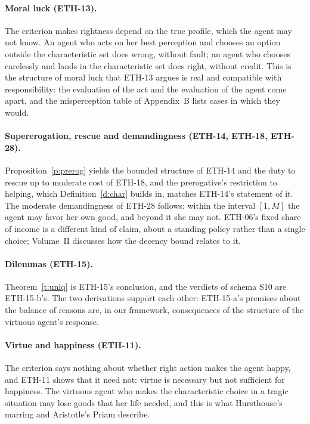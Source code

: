 \documentclass{situationist-preprint}
\begin{document}
\paragraph{Moral luck (ETH-13).} The criterion makes rightness depend on the true profile, which the agent may not know. An agent who acts on her best perception and chooses an option outside the characteristic set does wrong, without fault; an agent who chooses carelessly and lands in the characteristic set does right, without credit. This is the structure of moral luck that ETH-13 argues is real and compatible with responsibility: the evaluation of the act and the evaluation of the agent come apart, and the misperception table of Appendix~B lists \stnmisout{} cases in which they would.

\paragraph{Supererogation, rescue and demandingness (ETH-14, ETH-18, ETH-28).} Proposition~\ref{p:prerog} yields the bounded structure of ETH-14 and the duty to rescue up to moderate cost of ETH-18, and the prerogative's restriction to helping, which Definition~\ref{d:char} builds in, matches ETH-14's statement of it. The moderate demandingness of ETH-28 follows: within the interval $[1,M]$ the agent may favor her own good, and beyond it she may not. ETH-06's fixed share of income is a different kind of claim, about a standing policy rather than a single choice; Volume~II discusses how the decency bound relates to it.

\paragraph{Dilemmas (ETH-15).} Theorem~\ref{t:uniq} is ETH-15's conclusion, and the verdicts of schema S10 are ETH-15-b's. The two derivations support each other: ETH-15-a's premises about the balance of reasons are, in our framework, consequences of the structure of the virtuous agent's response.

\paragraph{Virtue and happiness (ETH-11).} The criterion says nothing about whether right action makes the agent happy, and ETH-11 shows that it need not: virtue is necessary but not sufficient for happiness. The virtuous agent who makes the characteristic choice in a tragic situation may lose goods that her life needed, and this is what Hursthouse's marring and Aristotle's Priam describe.
\end{document}
